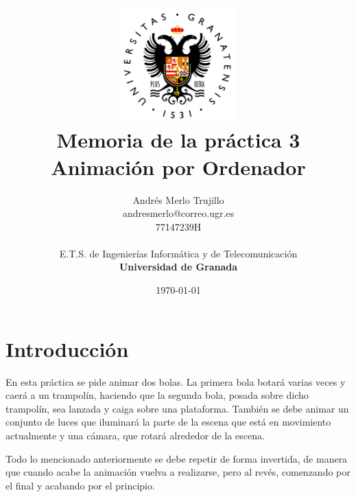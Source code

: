 \documentclass{article}
\title{
\includegraphics[width=1.75in]{imagenes/UGR-Logo.png} \\
\vspace*{1in}
\textbf{Memoria de la práctica 3} \\
Animación por Ordenador \\
\vspace*{0.5in}}
\author{Andrés Merlo Trujillo \\
andresmerlo@correo.ugr.es \\
77147239H \\ 
\vspace*{0.5in} \\
E.T.S. de Ingenierías Informática y de Telecomunicación \\
\textbf{Universidad de Granada}} \date{\today}
\begin{document}
\begin{titlingpage}
\maketitle
\end{titlingpage}

\tableofcontents

\newpage

\pagestyle{fancy}   %



\section{Introducción}
En esta práctica se pide animar dos bolas. La primera bola botará varias veces y caerá a un trampolín, haciendo que la segunda bola, posada sobre dicho trampolín, sea lanzada y caiga sobre una plataforma. También se debe animar un conjunto de luces que iluminará la parte de la escena que está en movimiento actualmente y una cámara, que rotará alrededor de la escena.

\bigskip

Todo lo mencionado anteriormente se debe repetir de forma invertida, de manera que cuando acabe la animación vuelva a realizarse, pero al revés, comenzando por el final y acabando por el principio.
\end{document}
